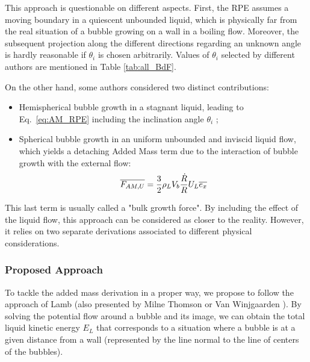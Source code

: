 This approach is questionable on different aspects. First, the RPE assumes a moving boundary in a quiescent unbounded liquid, which is physically far from the real situation of a bubble growing on a wall in a boiling flow. Moreover, the subsequent projection along the different directions regarding an unknown angle is hardly reasonable if $\theta_{i}$ is chosen arbitrarily. Values of $\theta_{i}$ selected by different authors are mentioned in Table \ref{tab:all_BdF}.

\npar

On the other hand, some authors \cite{klausner_vapor_1993, thorncroft_bubble_2001, guan_bubble_2015} considered two distinct contributions: 

\begin{itemize}

\item Hemispherical bubble growth in a stagnant liquid, leading to Eq.~\ref{eq:AM_RPE} including the inclination angle $\theta_{i}$ ;
\item Spherical bubble growth in an uniform unbounded and inviscid liquid flow, which yields a detaching Added Mass term  due to the interaction of bubble growth with the external flow: 
\begin{equation}
\overline{F_{AM,U}}= \frac{3}{2}\rho_{L}V_{b}\frac{\dot{R}}{R}U_{L} \overline{e_{x}} 
\label{eq:AM_bulk}
\end{equation} 

\end{itemize}

This last term is usually called a "bulk growth force". By including the effect of the liquid flow, this approach can be considered as closer to the reality. However, it relies on two separate derivations associated to different physical considerations.



\subsubsection{Proposed Approach}
\label{subsubsec:new_AM}

To tackle the added mass derivation in a proper way, we propose to follow the approach of Lamb \cite{lamb_hydrodynamics_1895} (also presented by Milne Thomson \cite{milne-thomson_theoretical_1938} or Van Winjgaarden \cite{wijngaarden_hydrodynamic_1976}). By solving the potential flow around a bubble and its image, we can obtain the total liquid kinetic energy $E_{L}$ that corresponds to a situation where a bubble is at a given distance from a wall (represented by the line normal to the line of centers of the bubbles). 

